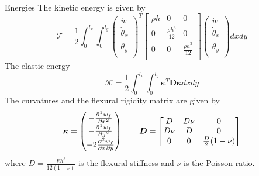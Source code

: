 \documentclass{beamer}
\begin{document}
\begin{frame}{Energies}
The kinetic energy is given by
\begin{equation*}
	\mathcal{T} = \frac{1}{2} \int_{0}^{l_x} \int_{0}^{l_y}
	\begin{pmatrix}
	\dot{w}\\
	\dot{\theta}_x\\
	\dot{\theta}_y\\
	\end{pmatrix}^T \begin{bmatrix}
	\rho h & 0 & 0\\
    0 & \frac{\rho h^3}{12} & 0\\
	0 & 0 & \frac{\rho h^3}{12}\\
	\end{bmatrix} \begin{pmatrix}
	\dot{w}\\
	\dot{\theta}_x\\
	\dot{\theta}_y\\
	\end{pmatrix}
	dx dy
\end{equation*}
The elastic energy
\begin{equation*}
\mathcal{K} = \frac{1}{2} \int_{0}^{l_x} \int_{0}^{l_y}
\bm{\kappa}^T \bm{D} \bm{\kappa} 
dx dy
\end{equation*} 
The curvatures and the flexural rigidity matrix are given by
 \begin{equation*}
\bm{\kappa} = \begin{pmatrix}
-\diffp[2]{w_f}{x} \vspace{1pt} \\
-\diffp[2]{w_f}{y} \vspace{1pt} \\
-2 \diffp{w_f}{x,y}  \vspace{1pt} \\
\end{pmatrix}  \qquad 
\bm{D}=\begin{bmatrix}
D & D \nu & 0\\
D \nu & D & 0\\
0 & 0 & \frac{D}{2} (1 - \nu)\\
\end{bmatrix}
\end{equation*}
where $D = \frac{E h^3}{12 (1 - \nu)}$ is the flexural stiffness and $\nu$ is the Poisson ratio.
\end{frame}
\end{document}
